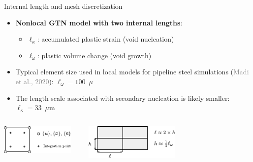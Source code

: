 \documentclass[9pt]{beamer}
\begin{document}

\begin{frame}{Internal length and mesh discretization}

    \begin{itemize}
        \item \textbf{Nonlocal GTN model with two internal lengths}: 
        \vspace{0.15cm}
        \begin{itemize}
        	\item $\ell_{\kappa}$: accumulated plastic strain (void nucleation)
        \vspace{0.15cm}
        \item $\ell_{\omega}$: plastic volume change (void growth)
        \end{itemize}
        \vspace{0.15cm}
        \item Typical element size used in local models for pipeline
steel simulations (\textcolor{gray}{Madi et al., 2020}): $\ell_{\omega} = 100$~$\mu$
\vspace{0.15cm}
		\item The length scale associated with secondary nucleation is
likely smaller: $\ell_{\kappa} = 33$~$\mu$m
    \end{itemize}

    \vspace{0.7cm}

    \begin{columns}
        \centering
        \includegraphics[width=0.9\textwidth]{Images/nlgeom_si_ig.pdf}
        
        \centering
        \includegraphics[width=0.9\textwidth]{Images/internal_length.pdf}
    \end{columns}

\end{frame}
\end{document}
